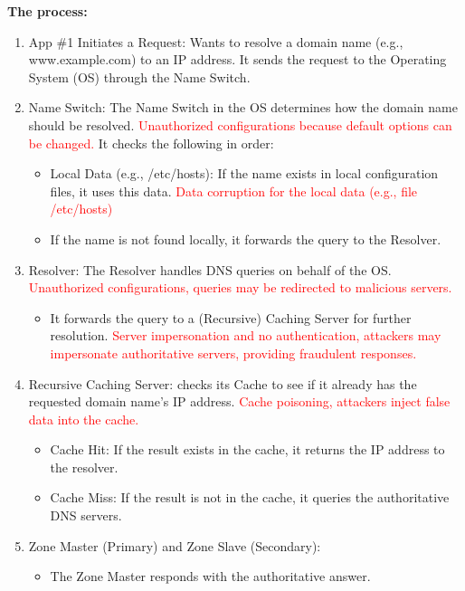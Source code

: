\begin{center}
    \textbf{The process:}
\end{center}
\begin{enumerate}
    \item App \#1 Initiates a Request: Wants to resolve a domain name (e.g., www.example.com) to an IP address. It sends the request to the Operating System (OS) through the Name Switch.
    \item Name Switch: 	The Name Switch in the OS determines how the domain name should be resolved. \textcolor{Red}{Unauthorized configurations because default options can be changed.} It checks the following in order:
    \begin{itemize}
        \item Local Data (e.g., /etc/hosts): If the name exists in local configuration files, it uses this data. \textcolor{Red}{Data corruption for the local data (e.g., file /etc/hosts)}
        \item If the name is not found locally, it forwards the query to the Resolver.
    \end{itemize}
    \item Resolver: The Resolver handles DNS queries on behalf of the OS. \textcolor{Red}{Unauthorized configurations, queries may be redirected to malicious servers.}
    \begin{itemize}
        \item It forwards the query to a (Recursive) Caching Server for further resolution. \textcolor{Red}{Server impersonation and no authentication, attackers may impersonate authoritative servers, providing fraudulent responses.}
    \end{itemize} 
    \item Recursive Caching Server: checks its Cache to see if it already has the requested domain name's IP address. \textcolor{Red}{Cache poisoning, attackers inject false data into the cache.}
    \begin{itemize}
        \item Cache Hit: If the result exists in the cache, it returns the IP address to the resolver.
        \item Cache Miss: If the result is not in the cache, it queries the authoritative DNS servers.
    \end{itemize}
    \item  Zone Master (Primary) and Zone Slave (Secondary):
    \begin{itemize}
        \item The Zone Master responds with the authoritative answer.

\end{itemize}
\end{enumerate}
